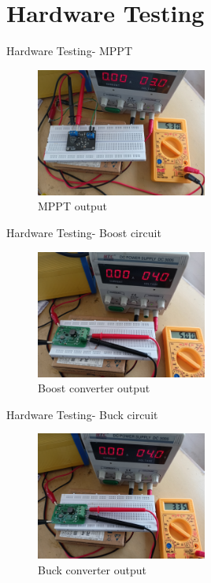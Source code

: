 \documentclass[aspectratio=169]{beamer}
\begin{document}
	\section{Hardware Testing}
					\begin{frame}{Hardware Testing- MPPT}
        \begin{figure}[h]
				\centering
				\includegraphics[width=0.5\textwidth]{diag/MPPT_out.jpg}
				\caption{MPPT output}
				\label{fig:mesh1}
			\end{figure}
		
	\end{frame}

    \begin{frame}{Hardware Testing- Boost circuit}
        \begin{figure}[h]
				\centering
				\includegraphics[width=0.5\textwidth]{diag/Boost_out.jpg}
				\caption{Boost converter output}
				\label{fig:mesh1}
			\end{figure}
	\end{frame}


    \begin{frame}{Hardware Testing- Buck circuit}
        \begin{figure}[h]
				\centering
				\includegraphics[width=0.5\textwidth]{diag/Buck_out.jpg}
				\caption{Buck converter output}
				\label{fig:mesh1}
			\end{figure}
		
	\end{frame}
\end{document}
